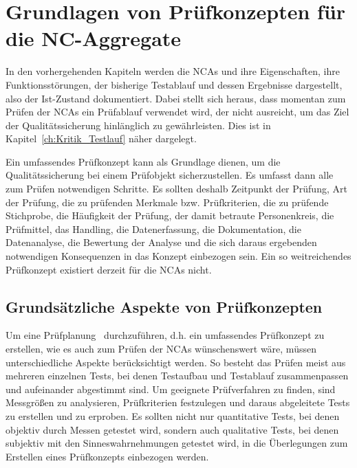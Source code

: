 \chapter{Grundlagen von Prüfkonzepten für die NC-Aggregate}\label{cha:Grundlagen_von_Pruefkonzepten_fuer_die_NCAs}



In den vorhergehenden Kapiteln werden die NCAs und ihre Eigenschaften, ihre Funktionsstörungen, der bisherige Testablauf und dessen Ergebnisse dargestellt, also der Ist-Zustand dokumentiert. Dabei stellt sich heraus, dass momentan zum Prüfen der NCAs ein Prüfablauf verwendet wird, der nicht ausreicht, um das Ziel der Qualitätssicherung hinlänglich zu gewährleisten. Dies ist in Kapitel~\ref{ch:Kritik_Testlauf} näher dargelegt.



Ein umfassendes Prüfkonzept kann als Grundlage dienen, um die Qualitätssicherung bei einem Prüfobjekt sicherzustellen. Es umfasst dann alle zum Prüfen \cite{DIN1319_1995} notwendigen Schritte. Es sollten deshalb Zeitpunkt der Prüfung, Art der Prüfung, die zu prüfenden Merkmale bzw. Prüfkriterien, die zu prüfende Stichprobe, die Häufigkeit der Prüfung, der damit betraute Personenkreis, die Prüfmittel, das Handling, die Datenerfassung, die Dokumentation, die Datenanalyse, die Bewertung der Analyse und die sich daraus ergebenden notwendigen Konsequenzen in das Konzept einbezogen sein. Ein so weitreichendes Prüfkonzept existiert derzeit für die NCAs nicht.

\section{Grundsätzliche Aspekte von Prüfkonzepten}

Um eine Prüfplanung~\cite{Bernards2005} durchzuführen, d.h. ein umfassendes Prüfkonzept zu erstellen, wie es auch zum Prüfen der NCAs wünschenswert wäre, müssen unterschiedliche Aspekte berücksichtigt werden. So besteht das Prüfen meist aus mehreren einzelnen Tests, bei denen Testaufbau und Testablauf zusammenpassen und aufeinander abgestimmt sind. Um geeignete Prüfverfahren zu finden, sind Messgrößen zu analysieren, Prüfkriterien festzulegen und daraus abgeleitete Tests zu erstellen und zu erproben. Es sollten nicht nur quantitative Tests, bei denen objektiv durch Messen getestet wird, sondern auch qualitative Tests, bei denen subjektiv mit den Sinneswahrnehmungen getestet wird, in die Überlegungen zum Erstellen eines Prüfkonzepts einbezogen werden.

